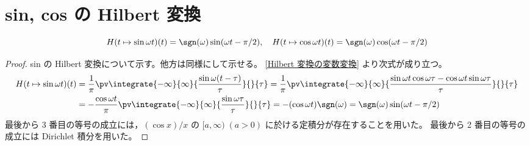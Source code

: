     \chapter{sin, cos の Hilbert 変換}
        \begin{shadebox}
            \[ H(t\mapsto\sin\omega t)(t) = \sgn(\omega)\sin(\omega t-\pi/2),\quad H(t\mapsto\cos\omega t)(t) = \sgn(\omega)\cos(\omega t-\pi/2) \]
        \end{shadebox}
        \begin{proof}
            \quad\par
            sin の Hilbert 変換について示す。他方は同様にして示せる。
            \ref{Hilbert 変換の変数変換} より次式が成り立つ。
            \begin{align*}
                H(t\mapsto\sin\omega t)(t) &= \frac{1}{\pi}\pv\integrate{-\infty}{\infty}{\frac{\sin\omega(t-\tau)}{\tau}}{}{\tau} = \frac{1}{\pi}\pv\integrate{-\infty}{\infty}{\frac{\sin\omega t\cos\omega\tau - \cos\omega t\sin\omega\tau}{\tau}}{}{\tau} \\
                &= -\frac{\cos\omega t}{\pi}\pv\integrate{-\infty}{\infty}{\frac{\sin\omega\tau}{\tau}}{}{\tau} = -(\cos\omega t)\sgn(\omega) = \sgn(\omega)\sin(\omega t-\pi/2)
            \end{align*}
            最後から 3 番目の等号の成立には，$(\cos x)/x$ の $[a,\infty)\;(a>0)$ に於ける定積分が存在することを用いた。
            最後から 2 番目の等号の成立には Dirichlet 積分を用いた。
        \end{proof}
